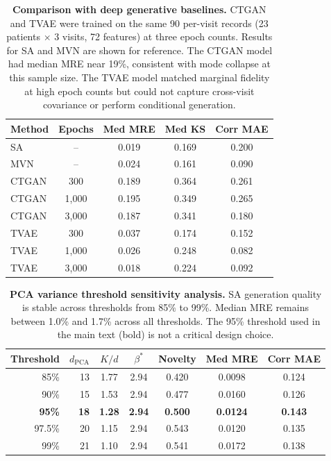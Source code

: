 \begin{table}[ht]
\centering
\caption{\textbf{Comparison with deep generative baselines.} CTGAN and TVAE
were trained on the same 90 per-visit records (23 patients $\times$ 3 visits,
72 features) at three epoch counts. Results for SA and MVN are shown for reference.
The CTGAN model had median MRE near 19\%, consistent with mode collapse at this sample size.
The TVAE model matched marginal fidelity at high epoch counts but could not capture
cross-visit covariance or perform conditional generation.}
\label{stab:ctgan}
\begin{tabular}{lcccc}
\toprule
Method & Epochs & Med MRE & Med KS & Corr MAE \\
\midrule
SA              & --   & 0.019 & 0.169 & 0.200 \\
MVN             & --   & 0.024 & 0.161 & 0.090 \\
\midrule
CTGAN           & 300   & 0.189 & 0.364 & 0.261 \\
CTGAN           & 1,000 & 0.195 & 0.349 & 0.265 \\
CTGAN           & 3,000 & 0.187 & 0.341 & 0.180 \\
\midrule
TVAE            & 300   & 0.037 & 0.174 & 0.152 \\
TVAE            & 1,000 & 0.026 & 0.248 & 0.082 \\
TVAE            & 3,000 & 0.018 & 0.224 & 0.092 \\
\bottomrule
\end{tabular}
\end{table}

\begin{table}[ht]
\centering
\caption{\textbf{PCA variance threshold sensitivity analysis.} SA generation
quality is stable across thresholds from 85\% to 99\%. Median MRE remains
between 1.0\% and 1.7\% across all thresholds. The 95\% threshold used in the
main text (bold) is not a critical design choice.}
\label{stab:pca-sensitivity}
\begin{tabular}{rrccccc}
\toprule
Threshold & $d_{\text{PCA}}$ & $K/d$ & $\beta^*$ & Novelty & Med MRE & Corr MAE \\
\midrule
85\% & 13 & 1.77 & 2.94 & 0.420 & 0.0098 & 0.124 \\
90\% & 15 & 1.53 & 2.94 & 0.477 & 0.0160 & 0.126 \\
\textbf{95\%} & \textbf{18} & \textbf{1.28} & \textbf{2.94} & \textbf{0.500} & \textbf{0.0124} & \textbf{0.143} \\
97.5\% & 20 & 1.15 & 2.94 & 0.543 & 0.0120 & 0.135 \\
99\% & 21 & 1.10 & 2.94 & 0.541 & 0.0172 & 0.138 \\
\bottomrule
\end{tabular}
\end{table}


